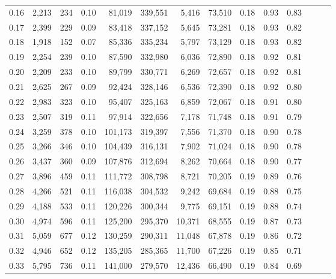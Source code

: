 \begin{tabular}{rrrrrrrrrrrrrr}
0.16 &   2,213 &    234 &  0.10 &   81,019 &  339,551 &   5,416 &  73,510 &  0.18 &  0.93 &      0.83 \\
0.17 &   2,399 &    229 &  0.09 &   83,418 &  337,152 &   5,645 &  73,281 &  0.18 &  0.93 &      0.82 \\
0.18 &   1,918 &    152 &  0.07 &   85,336 &  335,234 &   5,797 &  73,129 &  0.18 &  0.93 &      0.82 \\
0.19 &   2,254 &    239 &  0.10 &   87,590 &  332,980 &   6,036 &  72,890 &  0.18 &  0.92 &      0.81 \\
0.20 &   2,209 &    233 &  0.10 &   89,799 &  330,771 &   6,269 &  72,657 &  0.18 &  0.92 &      0.81 \\
0.21 &   2,625 &    267 &  0.09 &   92,424 &  328,146 &   6,536 &  72,390 &  0.18 &  0.92 &      0.80 \\
0.22 &   2,983 &    323 &  0.10 &   95,407 &  325,163 &   6,859 &  72,067 &  0.18 &  0.91 &      0.80 \\
0.23 &   2,507 &    319 &  0.11 &   97,914 &  322,656 &   7,178 &  71,748 &  0.18 &  0.91 &      0.79 \\
0.24 &   3,259 &    378 &  0.10 &  101,173 &  319,397 &   7,556 &  71,370 &  0.18 &  0.90 &      0.78 \\
0.25 &   3,266 &    346 &  0.10 &  104,439 &  316,131 &   7,902 &  71,024 &  0.18 &  0.90 &      0.78 \\
0.26 &   3,437 &    360 &  0.09 &  107,876 &  312,694 &   8,262 &  70,664 &  0.18 &  0.90 &      0.77 \\
0.27 &   3,896 &    459 &  0.11 &  111,772 &  308,798 &   8,721 &  70,205 &  0.19 &  0.89 &      0.76 \\
0.28 &   4,266 &    521 &  0.11 &  116,038 &  304,532 &   9,242 &  69,684 &  0.19 &  0.88 &      0.75 \\
0.29 &   4,188 &    533 &  0.11 &  120,226 &  300,344 &   9,775 &  69,151 &  0.19 &  0.88 &      0.74 \\
0.30 &   4,974 &    596 &  0.11 &  125,200 &  295,370 &  10,371 &  68,555 &  0.19 &  0.87 &      0.73 \\
0.31 &   5,059 &    677 &  0.12 &  130,259 &  290,311 &  11,048 &  67,878 &  0.19 &  0.86 &      0.72 \\
0.32 &   4,946 &    652 &  0.12 &  135,205 &  285,365 &  11,700 &  67,226 &  0.19 &  0.85 &      0.71 \\
0.33 &   5,795 &    736 &  0.11 &  141,000 &  279,570 &  12,436 &  66,490 &  0.19 &  0.84 &      0.69 \\

\end{tabular}
